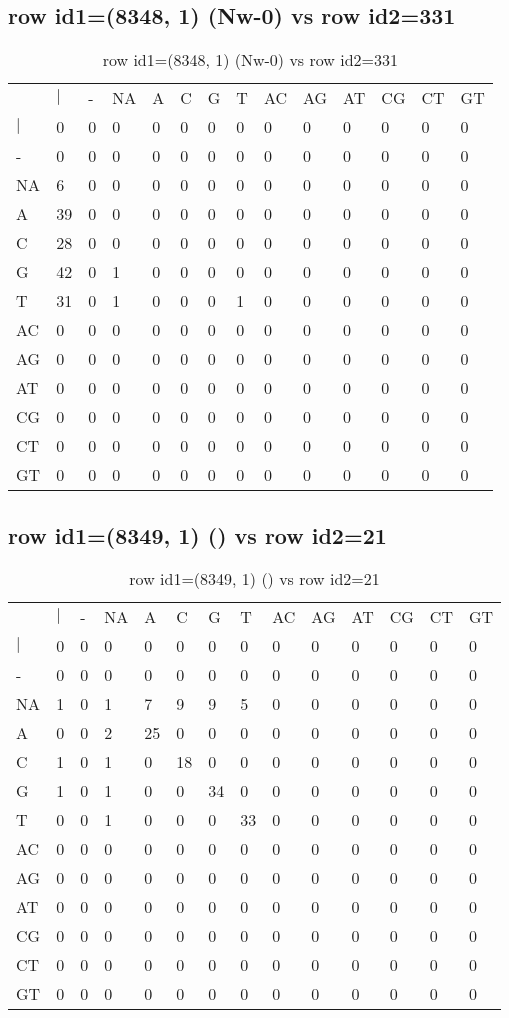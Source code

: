\subsection{row id1=(8348, 1) (Nw-0) vs row id2=331}
\begin{center}
\begin{longtable}{|l|l|l|l|l|l|l|l|l|l|l|l|l|l|}
\caption{row id1=(8348, 1) (Nw-0) vs row id2=331} \label{table_dm368}\\
\hline
\\
\hline
&$|$&-&NA&A&C&G&T&AC&AG&AT&CG&CT&GT\\
$|$&0&0&0&0&0&0&0&0&0&0&0&0&0\\
-&0&0&0&0&0&0&0&0&0&0&0&0&0\\
NA&6&0&0&0&0&0&0&0&0&0&0&0&0\\
A&39&0&0&0&0&0&0&0&0&0&0&0&0\\
C&28&0&0&0&0&0&0&0&0&0&0&0&0\\
G&42&0&1&0&0&0&0&0&0&0&0&0&0\\
T&31&0&1&0&0&0&1&0&0&0&0&0&0\\
AC&0&0&0&0&0&0&0&0&0&0&0&0&0\\
AG&0&0&0&0&0&0&0&0&0&0&0&0&0\\
AT&0&0&0&0&0&0&0&0&0&0&0&0&0\\
CG&0&0&0&0&0&0&0&0&0&0&0&0&0\\
CT&0&0&0&0&0&0&0&0&0&0&0&0&0\\
GT&0&0&0&0&0&0&0&0&0&0&0&0&0\\
\hline
\end{longtable}
\end{center}

\subsection{row id1=(8349, 1) () vs row id2=21}
\begin{center}
\begin{longtable}{|l|l|l|l|l|l|l|l|l|l|l|l|l|l|}
\caption{row id1=(8349, 1) () vs row id2=21} \label{table_dm370}\\
\hline
\\
\hline
&$|$&-&NA&A&C&G&T&AC&AG&AT&CG&CT&GT\\
$|$&0&0&0&0&0&0&0&0&0&0&0&0&0\\
-&0&0&0&0&0&0&0&0&0&0&0&0&0\\
NA&1&0&1&7&9&9&5&0&0&0&0&0&0\\
A&0&0&2&25&0&0&0&0&0&0&0&0&0\\
C&1&0&1&0&18&0&0&0&0&0&0&0&0\\
G&1&0&1&0&0&34&0&0&0&0&0&0&0\\
T&0&0&1&0&0&0&33&0&0&0&0&0&0\\
AC&0&0&0&0&0&0&0&0&0&0&0&0&0\\
AG&0&0&0&0&0&0&0&0&0&0&0&0&0\\
AT&0&0&0&0&0&0&0&0&0&0&0&0&0\\
CG&0&0&0&0&0&0&0&0&0&0&0&0&0\\
CT&0&0&0&0&0&0&0&0&0&0&0&0&0\\
GT&0&0&0&0&0&0&0&0&0&0&0&0&0\\
\hline
\end{longtable}
\end{center}


